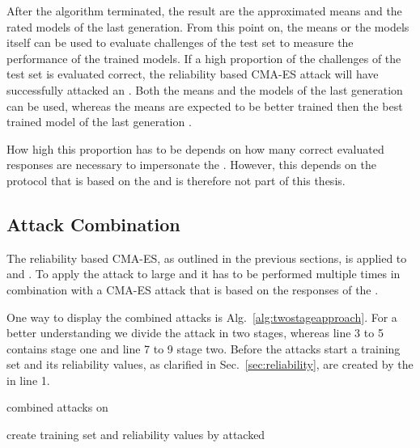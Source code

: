 After the algorithm terminated, the result are the approximated means and the rated models of the last generation.
From this point on, the means or the models itself can be used to evaluate challenges of the test set to measure the performance of the trained models. 
If a high proportion of the challenges of the test set is evaluated correct, the reliability based \ac{CMA-ES} attack will have successfully attacked an \apuf. %
Both the means and the models of the last generation can be used, whereas the means are expected to be better trained then the best trained model of the last generation \cite{Hansen2011TheTutorial}.

How high this proportion has to be depends on how many correct evaluated responses are necessary to impersonate the \puf.
However, this depends on the protocol that is based on the \puf and is therefore not part of this thesis.


\subsection{Attack Combination}
\label{sec:attackcombination}

The reliability based \ac{CMA-ES}, as outlined in the previous sections, is applied to \apufs and \mpuf.
To apply the attack to large \xpufs and \mxpuf it has to be performed multiple times in combination with a \ac{CMA-ES} attack that is based on the responses of the \puf \cite{Becker2015ThePUFs}.

One way to display the combined attacks is Alg.\ \ref{alg:twostageapproach}.
For a better understanding we divide the attack in two stages, whereas line 3 to 5 contains stage one and line 7 to 9 stage two.
Before the attacks start a training set and its reliability values, as clarified in Sec.\ \ref{sec:reliability}, are created by the \xpuf in line 1.

\SetAlCapHSkip{0.2em}
\begin{algorithm}[H] %
\Indm
\SetAlgoLined
\caption{combined attacks on \xpufs}
\label{alg:twostageapproach}
\Indp

create training set and reliability values by attacked \xpuf\\

\end{algorithm}

